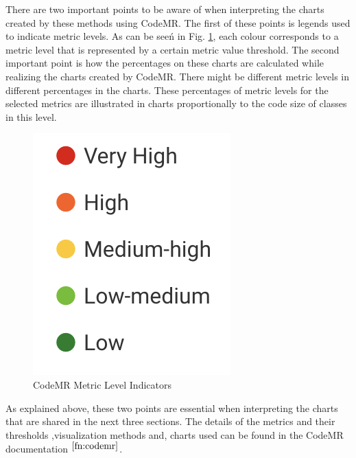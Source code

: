 There are two important points to be aware of when interpreting the charts created by these methods using CodeMR. The first of these points is legends used to indicate metric levels. As can be seeń in Fig. \ref{fig:code-mr-legends}, each colour corresponds to a metric level that is represented by a certain metric value threshold. The second important point is how the percentages on these charts are calculated while realizing the charts created by CodeMR. There might be different metric levels in different percentages in the charts. These percentages of metric levels for the selected metrics are illustrated in charts proportionally to the code size of classes in this level.
\begin{figure}[ht!]
    \centering
    \includegraphics[scale=0.7]{figures/code-mr-legends.png}
    \caption{CodeMR Metric Level Indicators}
    \label{fig:code-mr-legends}
\end{figure}
\FloatBarrier


As explained above, these two points are essential when interpreting the charts that are shared in the next three sections. The details of the metrics and their thresholds ,visualization methods and, charts used can be found in the CodeMR documentation $^{\ref{fn:codemr}}$.

